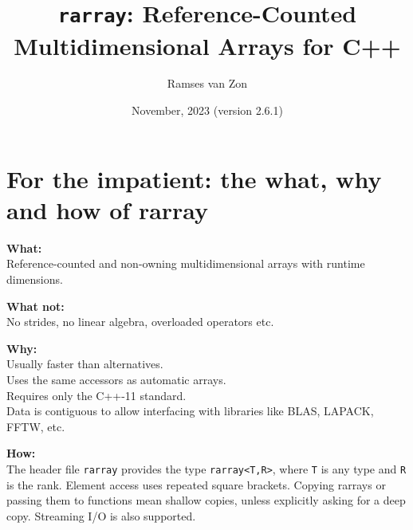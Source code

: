 \documentclass[11pt,twoside]{article}
\newcommand{\cxx}{C{++}}
\begin{document}
\setlength{\parskip}{1mm}

\title{\texttt{rarray}: Reference-Counted Multidimensional Arrays for \cxx}

\author{Ramses van Zon%
\vspace{-8pt}} 

\date{November, 2023 (version 2.6.1)\vspace{-7mm}}

\maketitle

\section{For the impatient: the what, why and how of rarray}

\noindent\textbf{What:}\\
Reference-counted and non-owning multidimensional arrays with runtime dimensions. 

\noindent\textbf{What not:}\\
No strides, no linear algebra, overloaded operators etc.

\noindent\textbf{Why:}\\
Usually faster than alternatives.\\
Uses the same accessors as automatic arrays.\\
Requires only the C++-11 standard.\\
Data is contiguous to allow interfacing with
libraries like BLAS, LAPACK, FFTW, etc.

\noindent\textbf{How:}\\
The header file \texttt{rarray} provides the type \texttt{rarray<T,R>}, where \texttt{T} is any type and {\tt R} is the rank. Element access uses repeated square brackets. Copying rarrays or passing them to functions mean shallow copies, unless explicitly asking for a deep copy. Streaming I/O is also supported.\vspace{2mm}
\end{document}
